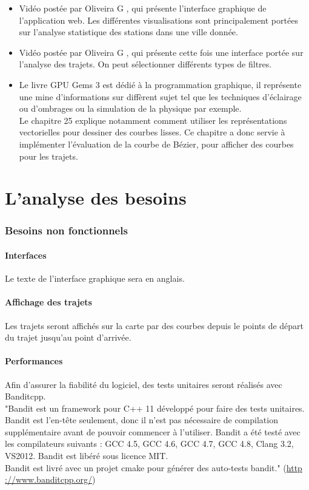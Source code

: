 \documentclass[12pt]{article}
\begin{document}
\begin{itemize}
			\item Vidéo postée par Oliveira G \cite{state_station}, qui présente l'interface
			graphique de l'application web. Les différentes visualisations sont principalement
			portées sur l'analyse statistique des stations dans une ville donnée.

			\item Vidéo postée par Oliveira G \cite{trips}, qui présente cette fois une
			interface portée sur l'analyse des trajets. On peut sélectionner différents types
			de filtres.
			
			\item Le livre GPU Gems 3 \cite{GPUGems} est dédié à la programmation graphique,
			il représente une mine d'informations sur diffèrent sujet tel que les techniques
			d'éclairage ou d'ombrages ou la simulation de la physique par exemple.\\
			Le chapitre 25 explique notamment comment utiliser les représentations vectorielles
			pour dessiner des courbes lisses. Ce chapitre a donc servie à implémenter 
			l'évaluation de la courbe de Bézier, pour afficher des courbes pour les trajets.
		\end{itemize}

\newpage
\part{L'analyse des besoins}

	\section{Besoins non fonctionnels}
		\subsection{Interfaces}
		Le texte de l’interface graphique sera en anglais.

		\subsection{Affichage des trajets}
		Les trajets seront affichés sur la carte par des courbes depuis le points de départ du
		trajet jusqu’au point d’arrivée.

		\subsection{Performances}
		Afin d’assurer la fiabilité du logiciel, des tests unitaires seront réalisés avec
		Banditcpp.\\
		"Bandit est un framework pour C++ 11 développé pour faire des tests unitaires. Bandit est
		l’en-tête seulement, donc il n’est pas nécessaire de compilation supplémentaire avant de
		pouvoir commencer à l’utiliser. Bandit a été testé avec les compilateurs suivants :
		GCC 4.5, GCC 4.6, GCC 4.7, GCC 4.8, Clang 3.2, VS2012.
		Bandit est libéré sous licence MIT. \\
		Bandit est livré avec un projet cmake pour générer des auto-tests bandit."
		(\url{http ://www.banditcpp.org/})\\
	
\end{document}
